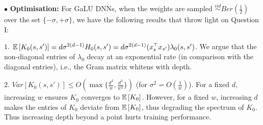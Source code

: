 \documentclass{article}
\begin{document}
$\bullet$ \textbf{Optimisation:} 
For GaLU DNNs, when the weights are sampled $\stackrel{iid}\sim Ber(\frac{1}{2})$ over the set $\{-\sigma,+\sigma\}$, we have the following results that throw light on Question I: 

$1.$ $\mathbb{E}\left[K_0(s,s')\right]=d\sigma^{2(d-1)}H_0(s,s')=d\sigma^{2(d-1)}(x_s^\top x_{s'})\lambda_0(s,s')$. We argue that the non-diagonal entries of $\lambda_0$ decay at an exponential rate (in comparison with the diagonal entries), i.e., the Gram matrix whitens with depth.

$2.$ $Var\left[K_0(s,s')\right]\leq O(\max\{\frac{d^2}{w}, \frac{d^3}{w^2}\})$ (for $\sigma^2=O(\frac{1}w)$). For a fixed $d$, increasing $w$ ensures $K_0$ converges to $\mathbb{E}\left[K_0\right]$. However, for a fixed $w$, increasing $d$ makes the entries of $K_0$ deviate from $\mathbb{E}\left[K_0\right]$, thus degrading the spectrum of $K_0$. Thus increasing depth beyond a point hurts training performance.
\end{document}
